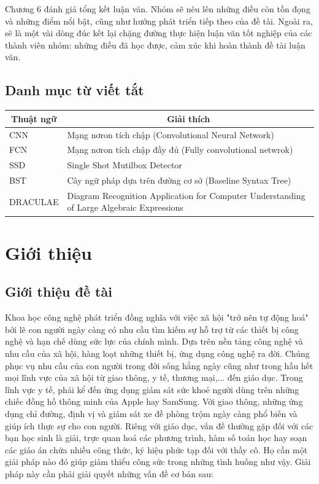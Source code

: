 \documentclass[a4paper]{article}
\theoremstyle{definition}
\begin{document}
	Chương 6 đánh giá tổng kết luận văn. Nhóm sẽ nêu lên những điều còn tồn đọng và những điểm nổi bật, cũng như hướng phát triển tiếp theo của đề tài. Ngoài ra, sẽ là một vài dòng đúc kết lại chặng đường thực hiện luận văn tốt nghiệp của các thành viên nhóm: những điều đã học được, cảm xúc khi hoàn thành đề tài luận văn.
	\newpage
	\tableofcontents
	\newpage
	\listoffigures
	\newpage
	\listoftables
	\newpage
	
	\subsection*{Danh mục từ viết tắt}
	
	
	
	\begin{table} [!htb]
		\centering
		\begin{tabular}{| m{4cm} | m{12cm}|}\hline
			\multicolumn{1}{|c|}{\textbf{Thuật ngữ}} & 
			\multicolumn{1}{|c|}{\textbf{Giải thích}}\\\hline
			CNN & Mạng nơron tích chập (Convolutional Neural Network)\\\hline
			FCN & Mạng nơron tích chập đầy đủ (Fully convolutional netwrok) \\\hline
			SSD & Single Shot Mutilbox Detector\\\hline
			BST & Cây ngữ pháp dựa trên đường cơ sở (Baseline Syntax Tree)\\\hline
			DRACULAE & Diagram Recognition Application for Computer Understanding of Large Algebraic Expressions\\\hline
		\end{tabular}
	\end{table}
	
	\newpage
	\section{Giới thiệu}
	\subsection{Giới thiệu đề tài}
	\label{subsec: introduce}
	Khoa học công nghệ phát triển đồng nghĩa với việc xã hội "trở nên tự động hoá" bởi lẽ con người ngày càng có nhu cầu tìm kiếm sự hỗ trợ từ các thiết bị công nghệ và hạn chế dùng sức lực của chính mình. Dựa trên nền tảng công nghệ và nhu cầu của xã hội, hàng loạt những thiết bị, ứng dụng công nghệ ra đời. Chúng phục vụ nhu cầu của con người trong đời sống hằng ngày cũng như trong hầu hết mọi lĩnh vực của xã hội từ giao thông, y tế, thương mại,... đến giáo dục. Trong lĩnh vực y tế, phải kể đến ứng dụng giám sát sức khoẻ người dùng trên những chiếc đồng hồ thông minh của Apple hay SamSung. Với giao thông, những ứng dụng chỉ đường, định vị và giám sát xe đề phòng trộm ngày càng phổ biến và giúp ích thực sự cho con người. Riêng với giáo dục, vấn đề thường gặp đối với các bạn học sinh là giải, trực quan hoá các phương trình, hàm số toán học hay soạn các giáo án chứa nhiều công thức, ký hiệu phức tạp đối với thầy cô. Họ cần một giải pháp nào đó giúp giảm thiểu công sức trong những tình huống như vậy. Giải pháp này cần phải giải quyết những vấn đề cơ bản sau:
	
\end{document}
